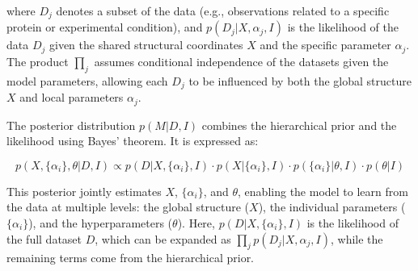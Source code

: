 \documentclass[pdflatex,sn-mathphys-num]{sn-jnl}%
\theoremstyle{thmstyleone}%
\theoremstyle{thmstyletwo}%
\theoremstyle{thmstylethree}%
\begin{document}
{where \( D_j \) denotes a subset of the data (e.g., observations related to a specific protein or experimental condition), and \( p(D_j | X, \alpha_j, I) \) is the likelihood of the data \( D_j \) given the shared structural coordinates \( X \) and the specific parameter \(\alpha_j\). The product \(\prod_j\) assumes conditional independence of the datasets given the model parameters, allowing each \( D_j \) to be influenced by both the global structure \( X \) and local parameters \(\alpha_j\).

The posterior distribution \( p(M | D, I) \) combines the hierarchical prior and the likelihood using Bayes' theorem. It is expressed as:

\[
p(X, \{\alpha_i\}, \theta | D, I) \propto p(D | X, \{\alpha_i\}, I) \cdot p(X | \{\alpha_i\}, I) \cdot p(\{\alpha_i\} | \theta, I) \cdot p(\theta | I)
\]

This posterior jointly estimates \( X \), \(\{\alpha_i\}\), and \(\theta\), enabling the model to learn from the data at multiple levels: the global structure (\( X \)), the individual parameters (\(\{\alpha_i\}\)), and the hyperparameters (\(\theta\)). Here, \( p(D | X, \{\alpha_i\}, I) \) is the likelihood of the full dataset \( D \), which can be expanded as \(\prod_j p(D_j | X, \alpha_j, I)\), while the remaining terms come from the hierarchical prior.


}
\end{document}
